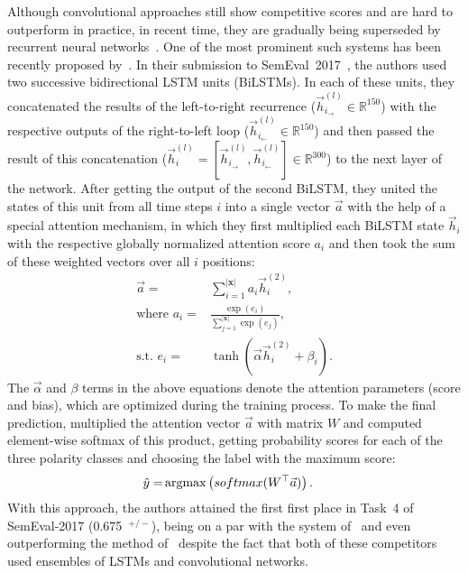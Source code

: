Although convolutional approaches still show competitive scores and
are hard to outperform in practice, in recent time, they are gradually
being superseded by recurrent neural networks~\cite{Xu:16,Wang:15}.
One of the most prominent such systems has been recently proposed
by~\citet{Baziotis:17}.  In their submission to
SemEval~2017~\cite{Rosenthal:17}, the authors used two successive
bidirectional LSTM units (BiLSTMs).  In each of these units, they
concatenated the results of the left-to-right recurrence
($\vec{h}^{(l)}_{i_{\rightarrow}}\in\mathbb{R}^{150}$) with the
respective outputs of the right-to-left loop
($\vec{h}^{(l)}_{i_{\leftarrow}}\in\mathbb{R}^{150}$) and then passed
the result of this concatenation ($\vec{h}_i^{(l)} =
[\vec{h}^{(l)}_{i_{\rightarrow}},
  \vec{h}^{(l)}_{i_{\leftarrow}}]\in\mathbb{R}^{300}$) to the next
layer of the network.  After getting the output of the second BiLSTM,
they united the states of this unit from all time steps $i$ into a
single vector $\vec{a}$ with the help of a special attention
mechanism, in which they first multiplied each BiLSTM state
$\vec{h}_i$ with the respective globally normalized attention score
$a_i$ and then took the sum of these weighted vectors over all $i$
positions:
\begin{align}
  \vec{a} =&
  \sum_{i=1}^{|\mathbf{x}|}a_i\vec{h}^{(2)}_i,\nonumber\\
  \mbox{where }a_i =&
  \frac{\exp(e_i)}{\sum_{j=1}^{|\mathbf{x}|}\exp(e_j)},\nonumber\\
  \textrm{s.t. }e_i =&
  \tanh\left(\vec{\alpha}\vec{h}^{(2)}_i + \beta_i\right).
\end{align}\label{eq:cgsa:baziotis-attention}%
The $\vec{\alpha}$ and $\beta$ terms in the above equations denote the
attention parameters (score and bias), which are optimized during the
training process.  To make the final prediction,
\citeauthor{Baziotis:17} multiplied the attention vector $\vec{a}$
with matrix $W$ and computed element-wise softmax of this product,
getting probability scores for each of the three polarity classes and
choosing the label with the maximum score:
\begin{align}
  \hat{y} =& \argmax\left(softmax(W^\top\vec{a})\right).
\end{align}
\noindent With this approach, the authors attained the first first
place in Task~4 of SemEval-2017 (0.675~\F{}$^{+/-}$), being on a par
with the system of~\citet{Cliche:17} and even outperforming the method
of~\citet{Rouvier:17} despite the fact that both of these competitors
used ensembles of LSTMs and convolutional networks.

